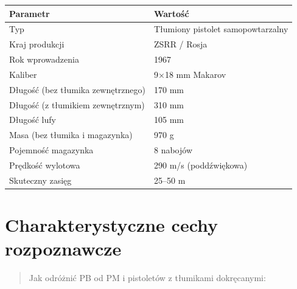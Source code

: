 \documentclass[12pt,openany,oneside]{book}
\begin{document}
\begin{longtable}[]{@{}ll@{}}
\toprule\noalign{}
Parametr & Wartość \\
\midrule\noalign{}
\endhead
\bottomrule\noalign{}
\endlastfoot
Typ & Tłumiony pistolet samopowtarzalny \\
Kraj produkcji & ZSRR / Rosja \\
Rok wprowadzenia & 1967 \\
Kaliber & 9×18 mm Makarov \\
Długość (bez tłumika zewnętrznego) & 170 mm \\
Długość (z tłumikiem zewnętrznym) & 310 mm \\
Długość lufy & 105 mm \\
Masa (bez tłumika i magazynka) & 970 g \\
Pojemność magazynka & 8 nabojów \\
Prędkość wylotowa & 290 m/s (poddźwiękowa) \\
Skuteczny zasięg & 25--50 m \\
\end{longtable}

\section{Charakterystyczne cechy
rozpoznawcze}\label{charakterystyczne-cechy-rozpoznawcze-89}

\begin{quote}
Jak odróżnić PB od PM i pistoletów z tłumikami dokręcanymi:
\end{quote}
\end{document}
